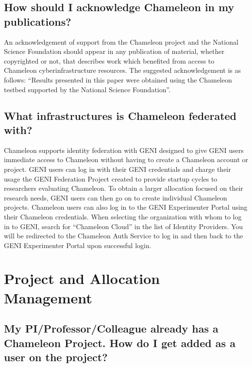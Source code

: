 \subsection{How should I acknowledge Chameleon in my
publications?}\label{how-should-i-acknowledge-chameleon-in-my-publications}

An acknowledgement of support from the Chameleon project and the
National Science Foundation should appear in any publication of
material, whether copyrighted or not, that describes work which
benefited from access to Chameleon cyberinfrastructure resources. The
suggested acknowledgement is as follows: ``Results presented in this
paper were obtained using the Chameleon testbed supported by the
National Science Foundation''.

\subsection{What infrastructures is Chameleon federated
with?}\label{what-infrastructures-is-chameleon-federated-with}

Chameleon supports identity federation with GENI designed to give GENI
users immediate access to Chameleon without having to create a Chameleon
account or project. GENI users can log in with their GENI credentials
and charge their usage the GENI Federation Project created to provide
startup cycles to researchers evaluating Chameleon. To obtain a larger
allocation focused on their research needs, GENI users can then go on to
create individual Chameleon projects. Chameleon users can also log in to
the GENI Experimenter Portal using their Chameleon credentials. When
selecting the organization with whom to log in to GENI, search for
``Chameleon Cloud'' in the list of Identity Providers. You will be
redirected to the Chameleon Auth Service to log in and then back to the
GENI Experimenter Portal upon successful login.

\section{Project and Allocation
Management}\label{project-and-allocation-management}

\subsection{My PI/Professor/Colleague already has a Chameleon Project.
How do I get added as a user on the
project?}\label{my-piprofessorcolleague-already-has-a-chameleon-project.-how-do-i-get-added-as-a-user-on-the-project}

